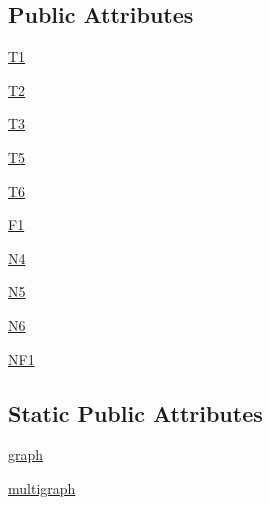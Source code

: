 \subsection*{Public Attributes}
\begin{DoxyCompactItemize}
\item 
\hyperlink{classnetworkx_1_1algorithms_1_1tree_1_1tests_1_1test__recognition_1_1TestTreeRecognition_a10b1fec45e83e39547a7fc60b1c45e96}{T1}
\item 
\hyperlink{classnetworkx_1_1algorithms_1_1tree_1_1tests_1_1test__recognition_1_1TestTreeRecognition_a9a2bb499e8e2f18b922c84669ed53cff}{T2}
\item 
\hyperlink{classnetworkx_1_1algorithms_1_1tree_1_1tests_1_1test__recognition_1_1TestTreeRecognition_a99b7c28e178eca192092e254809f53ba}{T3}
\item 
\hyperlink{classnetworkx_1_1algorithms_1_1tree_1_1tests_1_1test__recognition_1_1TestTreeRecognition_a117c0c240ecc0ec69ae622728c6dd1f0}{T5}
\item 
\hyperlink{classnetworkx_1_1algorithms_1_1tree_1_1tests_1_1test__recognition_1_1TestTreeRecognition_ae3a51893d3e382f1c2abf41d29d591cd}{T6}
\item 
\hyperlink{classnetworkx_1_1algorithms_1_1tree_1_1tests_1_1test__recognition_1_1TestTreeRecognition_ad007d488b69aa5119de7904982a72dd4}{F1}
\item 
\hyperlink{classnetworkx_1_1algorithms_1_1tree_1_1tests_1_1test__recognition_1_1TestTreeRecognition_a86098edb5b52757c33f0d1b0387b49ca}{N4}
\item 
\hyperlink{classnetworkx_1_1algorithms_1_1tree_1_1tests_1_1test__recognition_1_1TestTreeRecognition_a9214c807abc1399d077bb24d4817ce54}{N5}
\item 
\hyperlink{classnetworkx_1_1algorithms_1_1tree_1_1tests_1_1test__recognition_1_1TestTreeRecognition_a553849464459e579ac4234f2e0157d10}{N6}
\item 
\hyperlink{classnetworkx_1_1algorithms_1_1tree_1_1tests_1_1test__recognition_1_1TestTreeRecognition_ae74639607c3e0ede8912cd95ed572337}{N\+F1}
\end{DoxyCompactItemize}
\subsection*{Static Public Attributes}
\begin{DoxyCompactItemize}
\item 
\hyperlink{classnetworkx_1_1algorithms_1_1tree_1_1tests_1_1test__recognition_1_1TestTreeRecognition_ac4fcc83207b50c7008857cc7bde149c8}{graph}
\item 
\hyperlink{classnetworkx_1_1algorithms_1_1tree_1_1tests_1_1test__recognition_1_1TestTreeRecognition_a9dfb8cb47c9010e00c28d2144392ff4d}{multigraph}
\end{DoxyCompactItemize}



